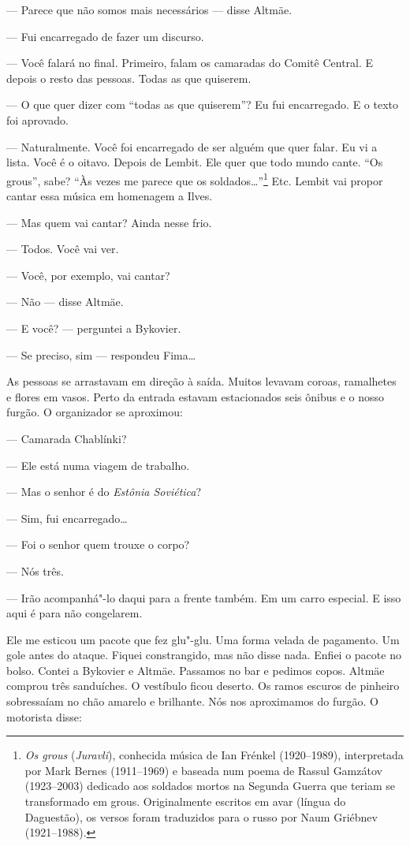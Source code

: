 --- Parece que não somos mais necessários --- disse Altmäe.

--- Fui encarregado de fazer um discurso.

--- Você falará no final. Primeiro, falam os camaradas do Comitê
Central. E depois o resto das pessoas. Todas as que quiserem.

--- O que quer dizer com ``todas as que quiserem''? Eu fui encarregado.
E o texto foi aprovado.

--- Naturalmente. Você foi encarregado de ser alguém que quer falar. Eu
vi a lista. Você é o oitavo. Depois de Lembit. Ele quer que todo mundo
cante. ``Os grous'', sabe? ``Às vezes me parece que os
soldados\ldots{}''\footnote{\emph{Os grous} (\emph{Juravli}),
  conhecida música de Ian Frénkel (1920--1989), interpretada por Mark
  Bernes (1911--1969) e baseada num poema de Rassul Gamzátov
  (1923--2003) dedicado aos soldados mortos na Segunda Guerra que teriam
  se transformado em grous. Originalmente escritos em avar (língua do
  Daguestão), os versos foram traduzidos para o russo por Naum Griébnev
  (1921--1988).} Etc. Lembit vai propor cantar essa música em homenagem
a Ilves.

--- Mas quem vai cantar? Ainda nesse frio.

--- Todos. Você vai ver.

--- Você, por exemplo, vai cantar?

--- Não --- disse Altmäe.

--- E você? --- perguntei a Bykovier.

--- Se preciso, sim --- respondeu Fima\ldots{}

As pessoas se arrastavam em direção à saída. Muitos levavam coroas,
ramalhetes e flores em vasos. Perto da entrada estavam estacionados seis
ônibus e o nosso furgão. O organizador se aproximou:

--- Camarada Chablínki?

--- Ele está numa viagem de trabalho.

--- Mas o senhor é do \emph{Estônia Soviética}?

--- Sim, fui encarregado\ldots{}

--- Foi o senhor quem trouxe o corpo?

--- Nós três.

--- Irão acompanhá"-lo daqui para a frente também. Em um carro especial.
E isso aqui é para não congelarem.

Ele me esticou um pacote que fez glu"-glu. Uma forma velada de pagamento.
Um gole antes do ataque. Fiquei constrangido, mas não disse nada. Enfiei
o pacote no bolso. Contei a Bykovier e Altmäe. Passamos no bar e pedimos
copos. Altmäe comprou três sanduíches. O vestíbulo ficou deserto. Os
ramos escuros de pinheiro sobressaíam no chão amarelo e brilhante. Nós
nos aproximamos do furgão. O motorista disse:

